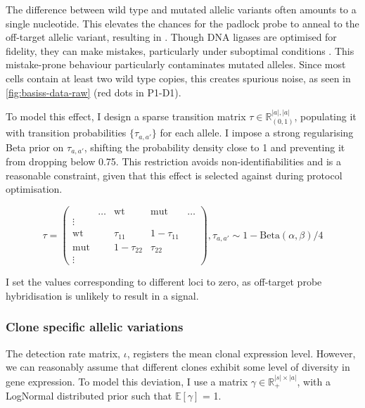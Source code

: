 The difference between wild type and mutated allelic variants often amounts to a single nucleotide. This elevates the chances for the padlock probe to anneal to the off-target allelic variant, resulting in . Though DNA ligases are optimised for fidelity, they can make mistakes, particularly under suboptimal conditions \parencite{Lohman2016-ec}. This mistake-prone behaviour particularly contaminates mutated alleles. Since most cells contain at least two wild type copies, this creates spurious noise, as seen in \cref{fig:basiss-data-raw} (red dots in P1-D1).

To model this effect, I design a sparse transition matrix ${\tau} \in \mathbb{R}^{|a|, |a|}_{(0,1)} $, populating it with transition probabilities $ \{ {\tau}_{a,a'}\} $ for each allele. I impose a strong regularising Beta prior on $ \tau_{a,a'} $, shifting the probability density close to 1 and preventing it from dropping below 0.75. This restriction avoids non-identifiabilities and is a reasonable constraint, given that this effect is selected against during protocol optimisation.

\begin{equation}
 {\tau} = \left(\begin{array}{c|cccc}
       & \ldots & \text{wt} & \text{mut} & \ldots \\ 
\hline
 \vdots &  &        &        & \\
\text{wt}      &  & \tau_{11} & 1-\tau_{11} &  \\
\text{mut}     &  & 1-\tau_{22} & \tau_{22} &  \\
\vdots  &  &        &        & 
\end{array}\right), {\tau}_{a,a'} \sim 1-\text{Beta}(\alpha, \beta)/4
\end{equation}

I set the values corresponding to different loci to zero, as off-target probe hybridisation is unlikely to result in a signal.

\subsubsection*{Clone specific allelic variations}

The detection rate matrix, $\iota$, registers the mean clonal expression level. However, we can reasonably assume that different clones exhibit some level of diversity in gene expression. To model this deviation, I use a matrix $\gamma \in \mathbb{R}_{+}^{|s|\times|a|}$, with a LogNormal distributed prior such that $\mathbb{E}[\gamma]$ = 1.

